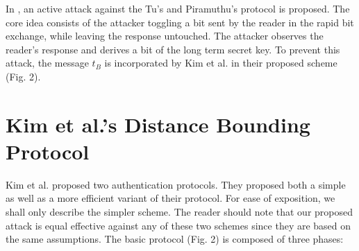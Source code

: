 \documentclass{article}
\begin{document}
In \cite{KimAKSP-2008-icisc}, an active attack against the Tu's and Piramuthu's protocol is proposed. The core idea consists of the attacker toggling a bit sent by the reader in the rapid bit exchange, while leaving the response untouched. The attacker observes the reader's response and derives a bit of the long term secret key. To prevent this attack, the message $t_B$ is incorporated by Kim et al. in their proposed scheme (Fig. 2).

\section{Kim et al.'s Distance Bounding Protocol}
Kim et al. \cite{KimAKSP-2008-icisc} proposed two authentication protocols. They proposed both a simple as well as a more efficient variant of their protocol. For ease of exposition, we shall only describe the simpler scheme. The reader should note that our proposed attack is equal effective against any of these two schemes since they are based on the same assumptions. The basic protocol  (Fig. 2) is composed of three phases:
\end{document}
